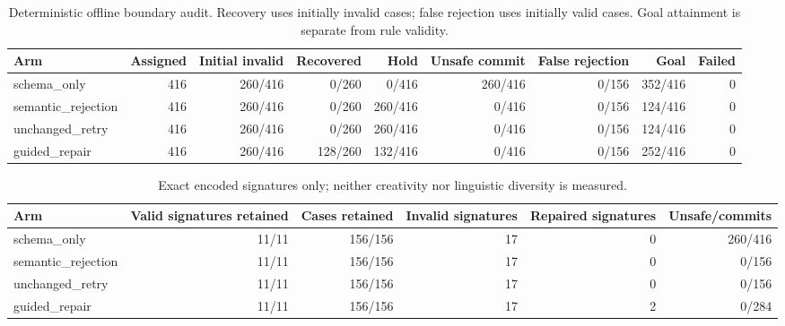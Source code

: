\begin{table}[t]
\centering
\scriptsize
\renewcommand{\arraystretch}{1.20}
\begin{tabular}{lrrrrrrrr}
\toprule
Arm & Assigned & Initial invalid & Recovered & Hold & Unsafe commit & False rejection & Goal & Failed \\
\midrule
schema\_only & 416 & 260/416 & 0/260 & 0/416 & 260/416 & 0/156 & 352/416 & 0 \\
semantic\_rejection & 416 & 260/416 & 0/260 & 260/416 & 0/416 & 0/156 & 124/416 & 0 \\
unchanged\_retry & 416 & 260/416 & 0/260 & 260/416 & 0/416 & 0/156 & 124/416 & 0 \\
guided\_repair & 416 & 260/416 & 128/260 & 132/416 & 0/416 & 0/156 & 252/416 & 0 \\
\bottomrule
\end{tabular}
\caption{Deterministic offline boundary audit. Recovery uses initially invalid cases; false rejection uses initially valid cases. Goal attainment is separate from rule validity.}
\label{tab:review-boundary-funnel}
\end{table}

\begin{table}[t]
\centering
\scriptsize
\renewcommand{\arraystretch}{1.20}
\begin{tabular}{lrrrrr}
\toprule
Arm & Valid signatures retained & Cases retained & Invalid signatures & Repaired signatures & Unsafe/commits \\
\midrule
schema\_only & 11/11 & 156/156 & 17 & 0 & 260/416 \\
semantic\_rejection & 11/11 & 156/156 & 17 & 0 & 0/156 \\
unchanged\_retry & 11/11 & 156/156 & 17 & 0 & 0/156 \\
guided\_repair & 11/11 & 156/156 & 17 & 2 & 0/284 \\
\bottomrule
\end{tabular}
\caption{Exact encoded signatures only; neither creativity nor linguistic diversity is measured.}
\label{tab:review-structural-retention}
\end{table}

